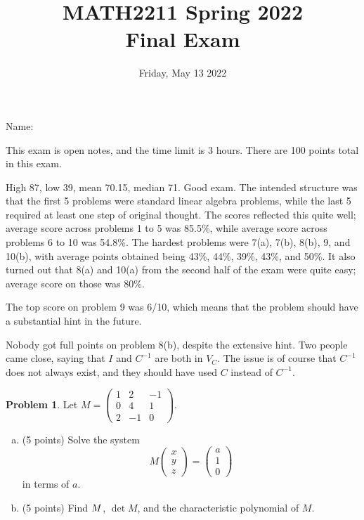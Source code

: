 \documentclass[11pt,oneside]{amsart}
\title{MATH2211 Spring 2022\\
Final Exam}
\author{Friday, May 13 2022}
\theoremstyle{definition}
\newtheorem{problem}{Problem}
\let\tr\relax
\DeclareMathOperator{\tr}{tr}
\begin{document}
    \maketitle

    Name: \underline{\hspace{6cm}}

    This exam is open notes, and the time limit is 3 hours. There are 100 points total in this exam.

    {\color{maroon}
    High 87, low 39, mean 70.15, median 71. Good exam. The intended structure was that the first 5 problems were standard linear algebra problems, while the last 5 required at least one step of original thought. The scores reflected this quite well; average score across problems 1 to 5 was 85.5\%, while average score across problems 6 to 10 was 54.8\%. The hardest problems were 7(a), 7(b), 8(b), 9, and 10(b), with average points obtained being 43\%, 44\%, 39\%, 43\%, and 50\%. It also turned out that 8(a) and 10(a) from the second half of the exam were quite easy; average score on those was 80\%.

    The top score on problem 9 was 6/10, which means that the problem should have a substantial hint in the future.

    Nobody got full points on problem 8(b), despite the extensive hint. Two people came close, saying that $I$ and $C^{-1}$ are both in $V_C$. The issue is of course that $C^{-1}$ does not always exist, and they should have used $C$ instead of $C^{-1}$.
    }

    \begin{problem}
        Let $M=\begin{pmatrix}
            1&2&-1\\
            0&4&1\\
            2&-1&0
        \end{pmatrix}$.
        \begin{enumerate}[(a)]
            \item (5 points) Solve the system
            \[M\begin{pmatrix}
                x\\y\\z
            \end{pmatrix}=\begin{pmatrix}
                a\\1\\0
            \end{pmatrix}\]
            in terms of $a$.
            \vfill
            \item (5 points) Find $\tr M$, $\det M$, and the characteristic polynomial of $M$.
            \vfill
        \end{enumerate}
    \end{problem}
    
\end{document}
